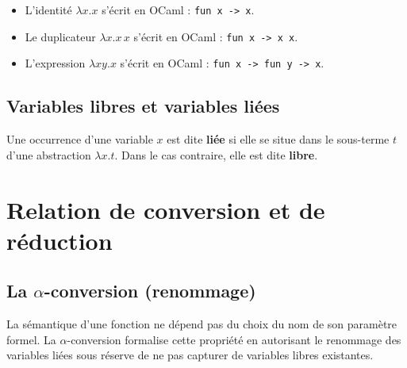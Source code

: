 \documentclass{article}
\begin{document}
\begin{itemize}
    \item L'identité $\lambda x. x$ s'écrit en OCaml : \texttt{fun x -> x}.
    \item Le duplicateur $\lambda x. x\,x$ s'écrit en OCaml : \texttt{fun x -> x x}.
    \item L'expression $\lambda x y. x$ s'écrit en OCaml : \texttt{fun x -> fun y -> x}.
\end{itemize}

\subsection{Variables libres et variables liées}

Une occurrence d'une variable $x$ est dite \textbf{liée} si elle se situe dans le sous-terme $t$ d'une abstraction $\lambda x. t$. Dans le cas contraire, elle est dite \textbf{libre}.



\section{Relation de conversion et de réduction}

\subsection{La \texorpdfstring{$\alpha$}{alpha}-conversion (renommage)}

La sémantique d'une fonction ne dépend pas du choix du nom de son paramètre formel. La $\alpha$-conversion formalise cette propriété en autorisant le renommage des variables liées sous réserve de ne pas capturer de variables libres existantes.

\end{document}
